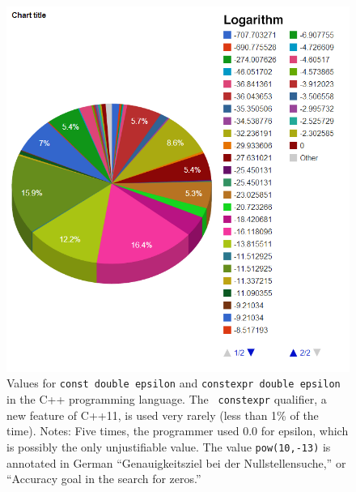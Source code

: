 \documentclass[twocolumn]{article}
\begin{document}
\begin{figure}[ht]
\begin{center}
\includegraphics[width=0.99 \linewidth]{chart-cpp}
\end{center}\vspace{-0.1in}
\caption{
  Values for {\tt const double epsilon} and {\tt constexpr
    double epsilon} in the C++ programming language. The {\tt
    constexpr} qualifier, a new feature of C++11, is used very rarely
  (less than 1\% of the time).
  Notes:
  Five times, the programmer used 0.0 for epsilon, which is possibly
  the only unjustifiable value. The value {\tt pow(10,-13)} is
  annotated in German ``Genauigkeitsziel bei der Nullstellensuche,''
  or ``Accuracy goal in the search for zeros.'' }
\label{fig:cppdouble}
\end{figure}
\end{document}
